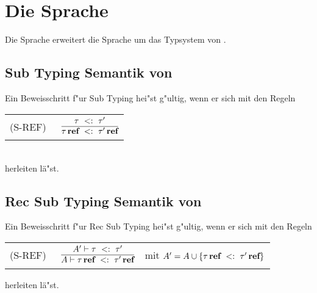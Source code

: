 \section{Die Sprache \LFOURSUB}
Die Sprache \LFOURSUB erweitert die Sprache \LTHREESUB um das Typsystem von \LFOUR. 


\subsection{Sub Typing Semantik von \LFOURSUB}

Ein Beweisschritt f"ur Sub Typing hei"st g"ultig, wenn er sich mit den Regeln  \\[5mm]
  \begin{tabular}{ll}
    \mbox{(S-REF)\ }      & $\RULE{\subtype{\tau} {\tau'} }
                              {\subtype{\reftype{\tau}} {\reftype{\tau'}}}$ \\[4mm]
   \end{tabular} \\[7mm]

herleiten l\"a"st.

\subsection{Rec Sub Typing Semantik von \LFOURSUB}

Ein Beweisschritt f"ur Rec Sub Typing hei"st g"ultig, wenn er sich mit den Regeln  \\[5mm]
 \begin{tabular}{lll}
    \mbox{(S-REF)\ }      & $\RULE{A' \vdash \subtype{\tau} {\tau'} }
                              {A \vdash \subtype{\reftype{\tau}} {\reftype{\tau'}}}$ 
                                  & mit $A' = A \cup \{\tau\,\textbf{ref}\ <:\ \tau'\,\textbf{ref}\}$ \\[4mm]
          \end{tabular}


herleiten l\"a"st.


